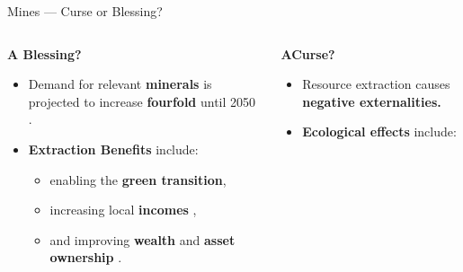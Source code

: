 \documentclass[aspectratio=169,11pt,dvipsnames, handout]{beamer}
\begin{document}
\begin{frame}{Mines — Curse or Blessing?}
\vspace{-2.5em}
    \begin{columns}[t]
        \begin{column}{0.45\textwidth}
            \begin{tcolorbox}[colback=defaultclr!20, colframe=defaultclr!20, fontupper=\bfseries\color{defaultclr!40!black}, width=\textwidth, sharp corners, boxrule=0pt, halign=center]
                \textbf{A Blessing?}
            \end{tcolorbox}
            \vspace{-0.75em}
            \begin{itemize}
                \item Demand for relevant \textbf{minerals} is projected to increase \textbf{fourfold} until 2050 \parencite{hund2023}.
                \vspace{0.5em}\item \colorbox{defaultclr!15}{\bfseries Extraction Benefits} include:
        \begin{itemize}
            \item enabling the \textbf{green transition},
            \item increasing local \textbf{incomes} \parencite{bazillier2020},
            \item and improving \textbf{wealth} and \textbf{asset ownership} \parencite{vondergoltz2019}.
        \end{itemize}
            \end{itemize}
        \end{column}
        \begin{column}{0.45\textwidth}
            \begin{tcolorbox}[colback=secondclr!20, colframe=secondclr!20, fontupper=\bfseries\color{secondclr!40!black}, width=\textwidth, sharp corners, boxrule=0pt, halign=center]
                \textbf{A\phantom{j}Curse?}
            \end{tcolorbox}
            \vspace{-0.75em}
            \begin{itemize}
                \item Resource extraction causes \textbf{negative externalities.}
                \item \colorbox{secondclr!15}{\bfseries Ecological effects} include:

\end{itemize}
\end{column}
\end{columns}
\end{frame}
\end{document}
